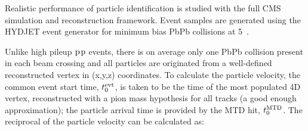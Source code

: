 

Realistic performance of particle
identification is studied with the full CMS simulation and
reconstruction framework. Event samples are generated using the HYDJET
event generator for minimum bias PbPb collisions at 5~\TeV. 

Unlike high pileup $\Pp$$\Pp$ events, there is on average only one
PbPb collision present in each beam crossing and all particles are originated
from a well-defined reconstructed vertex in (x,y,z) coordinates. To
calculate the particle velocity, the common event start time,
$t_{0}^{\rm evt}$, is taken to  be the time of the most populated 4D
vertex, reconstructed with a pion mass hypothesis for all tracks (a
good enough approximation); the particle arrival time is provided by
the MTD hit, $t_{0}^{\rm MTD}$. The reciprocal of the particle
velocity can be calculated as:

